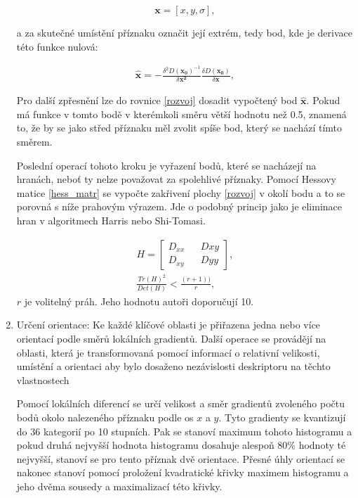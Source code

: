 \begin{enumerate}
			\begin{equation} \mathbf{x} = [x, y, \sigma{}], \end{equation}
	
			a za skutečné umístění příznaku označit její extrém, tedy bod, kde je derivace této funkce nulová:
			
			\begin{align}
			\mathbf{\hat{x}} = - \frac{\delta{}^2 D(\mathbf{x_0})^{-1}}{\delta{}\mathbf{x^2}}
			\frac{\delta D(\mathbf{x_0})}{\delta \mathbf{x}},
			\end{align}
			
			Pro další zpřesnění lze do rovnice \ref{rozvoj} dosadit vypočtený bod $\hat{\mathbf{x}}$. Pokud má funkce v tomto bodě v kterémkoli směru větší hodnotu než 0.5, znamená to, že by se jako střed příznaku měl zvolit spíše bod, který se nachází tímto směrem.
			
			Poslední operací tohoto kroku je vyřazení bodů, které se nacházejí na hranách, neboť ty nelze považovat za spolehlivé příznaky. Pomocí Hessovy matice \ref{hess_matr} se vypočte zakřivení plochy \ref{rozvoj} v okolí bodu a to se porovná s níže prahovým výrazem. Jde o podobný princip jako je eliminace hran v algoritmech Harris nebo Shi-Tomasi.
			
			\begin{align}
			\label{hess_matr}
			H = \begin{bmatrix}
			D_{xx} && D{xy} \\
			D_{xy} && D{yy}
			\end{bmatrix},\\
			\frac{Tr(H)^2}{Det(H)} < \frac{(r+1))}{r},
			\end{align}
			$r$ je volitelný práh. Jeho hodnotu  autoři
		    \cite{lowe2004distinctive} doporučují 10.
			
								
		\item Určení orientace: Ke každé klíčové oblasti je přiřazena jedna nebo více orientací podle směrů lokálních gradientů. Další operace se provádějí na oblasti, která je transformovaná pomocí informací o relativní velikosti, umístění a orientaci aby bylo dosaženo nezávislosti deskriptoru na těchto  vlastnostech
		
			Pomocí lokálních diferencí se určí velikost a směr gradientů zvoleného počtu bodů okolo nalezeného příznaku podle os $x$ a $y$. Tyto gradienty se kvantizují do 36 kategorií po 10 stupních. Pak se stanoví maximum tohoto histogramu a pokud druhá nejvyšší hodnota histogramu dosahuje alespoň 80\% hodnoty té nejvyšší, stanoví se pro tento příznak dvě orientace. Přesné úhly orientací se nakonec stanoví pomocí proložení kvadratické křivky maximem histogramu a jeho dvěma sousedy a maximalizací této křivky.	
					

\end{enumerate}
